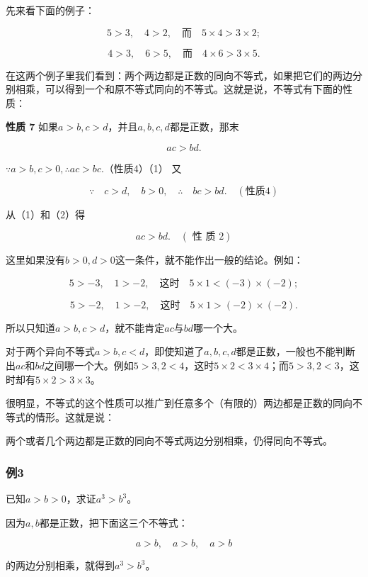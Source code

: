 先来看下面的例子：

\[
5 > 3, \quad 4 > 2, \quad \text{而} \quad 5 \times 4 > 3 \times 2;
\]

\[
4 > 3, \quad 6 > 5, \quad \text{而} \quad 4 \times 6 > 3 \times 5.
\]

在这两个例子里我们看到：两个两边都是正数的同向不等式，如果把它们的两边分别相乘，可以得到一个和原不等式同向的不等式。这就是说，不等式有下面的性质：

\textbf{性质 7} 如果\(a > b, c > d\)，并且\(a, b, c, d\)都是正数，那末

\[
a c > b d.
\]

\(\because a > b, c > 0, \therefore ac > bc.\)（性质4）（1） 又

\[
\because \quad c > d, \quad b > 0, \quad \therefore \quad b c > b d. \quad (\text{性质4}) \tag {2}
\]

从（1）和（2）得

\[
a c > b d. \quad (\text{ 性 质 } 2)
\]

这里如果没有\(b > 0, d > 0\)这一条件，就不能作出一般的结论。例如：

\[
5 > - 3, \quad 1 > - 2, \quad \text{这时} \quad 5 \times 1 < (- 3) \times (- 2);
\]

\[
5 > - 2, \quad 1 > - 2, \quad \text{这时} \quad 5 \times 1 > (- 2) \times (- 2).
\]

所以只知道\(a > b, c > d\)，就不能肯定\(ac\)与\(bd\)哪一个大。

对于两个异向不等式\(a > b, c < d\)，即使知道了\(a,b,c,d\)都是正数，一般也不能判断出\(ac\)和\(bd\)之间哪一个大。例如\(5 > 3, 2 < 4\)，这时\(5 \times 2 < 3 \times 4\)；而\(5 > 3, 2 < 3\)，这时却有\(5 \times 2 > 3 \times 3\)。

很明显，不等式的这个性质可以推广到任意多个（有限的）两边都是正数的同向不等式的情形。这就是说：

两个或者几个两边都是正数的同向不等式两边分别相乘，仍得同向不等式。

\subsubsection{例3}

已知\(a > b > 0\)，求证\(a^3 > b^3\)。

 因为\(a, b\)都是正数，把下面这三个不等式：

\[
a > b, \quad a > b, \quad a > b
\]

的两边分别相乘，就得到\(a^{3} > b^{3}\)。

